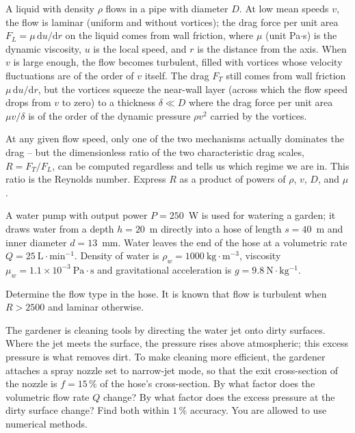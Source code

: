 A liquid with density $\rho$ flows in a pipe with diameter $D$. At low mean
speeds $v$, the flow is laminar (uniform and without vortices); the drag force
per unit area $F_L = \mu\,\mathrm{d}u/\mathrm{d}r$ on the liquid comes from wall
friction, where $\mu$ (unit Pa$\cdot$s) is the dynamic viscosity, $u$ is the
local speed, and $r$ is the distance from the axis. When $v$ is large enough, the
flow becomes turbulent, filled with vortices whose velocity fluctuations are of
the order of $v$ itself. The drag $F_T$ still comes from wall friction
$\mu\,\mathrm{d}u/\mathrm{d}r$, but the vortices squeeze the near-wall layer
(across which the flow speed drops from $v$ to zero) to a thickness
$\delta \ll D$ where the drag force per unit area $\mu v/\delta$ is of the order
of the dynamic pressure $\rho v^2$ carried by the vortices.

 At any given flow speed, only one of the two mechanisms actually
dominates the drag -- but the dimensionless ratio of the two characteristic drag
scales, $R = F_T/F_L$, can be computed regardless and tells us which regime we
are in. This ratio is the Reynolds number. Express $R$ as a product of powers of
$\rho$, $v$, $D$, and $\mu$.

A water pump with output power $P = 250$~W is used for watering a garden; it
draws water from a depth $h = 20$~m directly into a hose of length $s = 40$~m and
inner diameter $d = 13$~mm. Water leaves the end of the hose at a volumetric rate
$Q = 25~\mathrm{L\cdot min^{-1}}$. Density of water is
$\rho_w = 1000~\mathrm{kg\cdot m^{-3}}$, viscosity
$\mu_w = 1.1\times10^{-3}~\mathrm{Pa\cdot s}$ and gravitational acceleration is
$g = 9.8~\mathrm{N\cdot kg^{-1}}$.

 Determine the flow type in the hose. It is known that flow is
turbulent when $R > 2500$ and laminar otherwise.

 The gardener is cleaning tools by directing the water jet onto
dirty surfaces. Where the jet meets the surface, the pressure rises above
atmospheric; this excess pressure is what removes dirt. To make cleaning more
efficient, the gardener attaches a spray nozzle set to narrow-jet mode, so that
the exit cross-section of the nozzle is $f = 15\,\%$ of the hose's
cross-section. By what factor does the volumetric flow rate $Q$ change? By what
factor does the excess pressure at the dirty surface change? Find both within
$1\,\%$ accuracy. You are allowed to use numerical methods.
